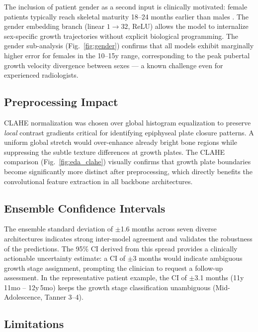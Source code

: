 \documentclass[conference]{IEEEtran}
\begin{document}
The inclusion of patient gender as a second input is clinically
motivated: female patients typically reach skeletal maturity 18--24
months earlier than males \cite{greulich1959radiographic}. The gender
embedding branch (linear $1 \to 32$, ReLU) allows the model to
internalize sex-specific growth trajectories without explicit
biological programming. The gender sub-analysis
(Fig.~\ref{fig:gender}) confirms that all models exhibit marginally
higher error for females in the 10--15y range, corresponding to the
peak pubertal growth velocity divergence between sexes — a known
challenge even for experienced radiologists.

\subsection{Preprocessing Impact}

CLAHE normalization was chosen over global histogram equalization
to preserve \emph{local} contrast gradients critical for identifying
epiphyseal plate closure patterns. A uniform global stretch would
over-enhance already bright bone regions while suppressing the
subtle texture differences at growth plates. The CLAHE comparison
(Fig.~\ref{fig:eda_clahe}) visually confirms that growth plate
boundaries become significantly more distinct after preprocessing,
which directly benefits the convolutional feature extraction in all
backbone architectures.

\subsection{Ensemble Confidence Intervals}

The ensemble standard deviation of $\pm$1.6 months across seven
diverse architectures indicates strong inter-model agreement and
validates the robustness of the predictions. The 95\% CI derived
from this spread provides a clinically actionable uncertainty
estimate: a CI of $\pm$3 months would indicate ambiguous growth
stage assignment, prompting the clinician to request a follow-up
assessment. In the representative patient example, the CI of
$\pm$3.1 months (11y\,11mo -- 12y\,5mo) keeps the growth stage
classification unambiguous (Mid-Adolescence, Tanner 3--4).

\subsection{Limitations}
\end{document}
